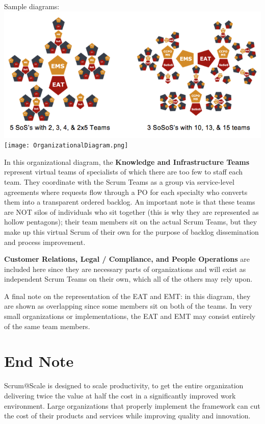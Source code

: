 \documentclass[12pt,a4paper,parskip=full]{scrartcl}
\begin{document}
Sample diagrams:
\includegraphics[width=1.0\linewidth]{VariableSoS-R2.png}
\texttt{[image: OrganizationalDiagram.png]}

In this organizational diagram, the \textbf{Knowledge and Infrastructure Teams} represent virtual teams of specialists of which there are too few to staff each team. They coordinate with the Scrum Teams as a group via service-level agreements where requests flow through a PO for each specialty who converts them into a transparent ordered backlog. An important note is that these teams are NOT silos of individuals who sit together (this is why they are represented as hollow pentagons); their team members sit on the actual Scrum Teams, but they make up this virtual Scrum of their own for the purpose of backlog dissemination and process improvement.

\textbf{Customer Relations, Legal / Compliance, and People Operations} are included here since they are necessary parts of organizations and will exist as independent Scrum Teams on their own, which all of the others may rely upon.

A final note on the representation of the EAT and EMT: in this diagram, they are shown as overlapping since some members sit on both of the teams. In very small organizations or implementations, the EAT and EMT may consist entirely of the same team members.

\section{End Note}

Scrum@Scale is designed to scale productivity, to get the entire organization delivering twice the value at half the cost in a significantly improved work environment. Large organizations that properly implement the framework can cut the cost of their products and services while improving quality and innovation.
\end{document}
